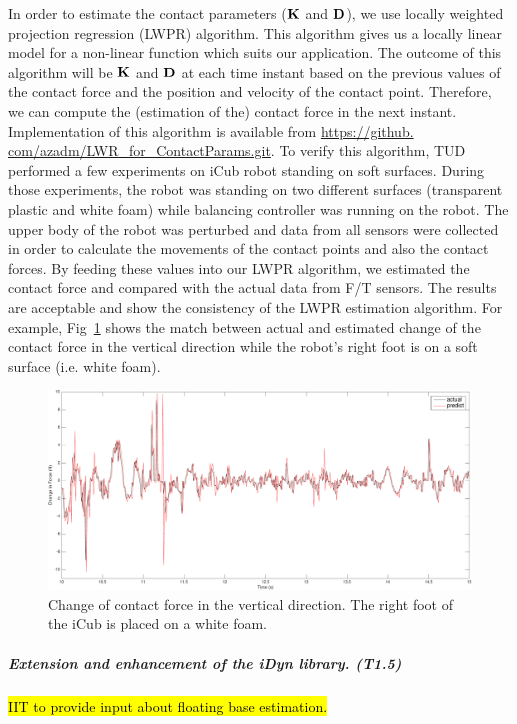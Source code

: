 In order to estimate the contact parameters ($\mathbf{K}$ and $\mathbf{D}$), we use locally
weighted projection regression (LWPR) algorithm.  This algorithm gives us a
locally linear model for a non-linear function which suits our application.
The outcome of this algorithm will be $\mathbf{K}$ and $\mathbf{D}$ at each time instant
based on the previous values of the contact force and the position and
velocity of the contact point.  Therefore, we can compute the (estimation of
the) contact force in the next instant.  Implementation of this algorithm is
available from \url{https://github. com/azadm/LWR_for_ContactParams.git}.  To
verify this algorithm, TUD performed a few experiments on iCub robot standing
on soft surfaces.  During those experiments, the robot was standing on two
different surfaces (transparent plastic and white foam) while balancing
controller was running on the robot.  The upper body of the robot was
perturbed and data from all sensors were collected in order to calculate the
movements of the contact points and also the contact forces.  By feeding these
values into our LWPR algorithm, we estimated the contact force and compared
with the actual data from F/T sensors.  The results are acceptable and show
the consistency of the LWPR estimation algorithm.  For example,
Fig~\ref{force_estimate} shows the match between actual and estimated change
of the contact force in the vertical direction while the robot's right foot is
on a soft surface (i.e. white foam).
%
\begin{figure}
  \centering
  \includegraphics[scale=0.4]{images/force_estimate.pdf}
  \caption{Change of contact force in the vertical direction.  The right foot
    of the iCub is placed on a white foam.}
  \label{force_estimate}
\end{figure}


\subparagraph{Extension and enhancement of the iDyn library. (T1.5)}
\label{sec:T15}

\hl{IIT to provide input about floating base estimation.}








